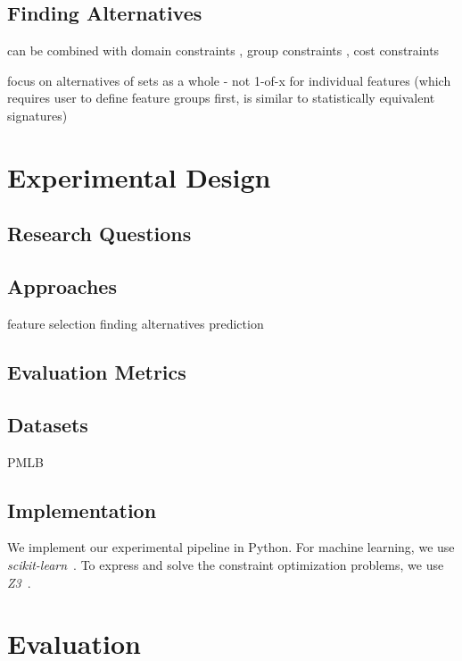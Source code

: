 \documentclass{article}
\begin{document}
\subsection{Finding Alternatives}

can be combined with domain constraints \cite{groves2015toward}, group constraints \cite{yuan2006model}, cost constraints \cite{paclik2002feature}

focus on alternatives of sets as a whole - not 1-of-x for individual features (which requires user to define feature groups first, is similar to statistically equivalent signatures)

\section{Experimental Design}
\label{sec:experimental-design}

\subsection{Research Questions}

\subsection{Approaches}

feature selection
finding alternatives
prediction

\subsection{Evaluation Metrics}

\subsection{Datasets}

PMLB \cite{olson2017pmlb, romano2021pmlb}

\subsection{Implementation}

We implement our experimental pipeline in Python.
For machine learning, we use \emph{scikit-learn}~\cite{pedregosa2011scikit-learn}.
To express and solve the constraint optimization problems, we use \emph{Z3}~\cite{deMoura2008z3}.

\section{Evaluation}
\label{sec:evaluation}
\end{document}
